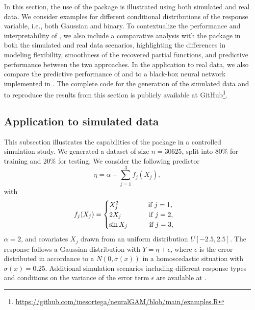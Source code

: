 In this section, the use of the  package is illustrated using both simulated and real data. We consider examples for different conditional distributions of the response variable, i.e., both Gaussian and binary. 
To contextualize the performance and interpretability of , we also include a comparative analysis with the  package in both the simulated and real data scenarios, highlighting the differences in modeling flexibility, smoothness of the recovered partial functions, and predictive performance between the two approaches. In the application to real data, we also compare the predictive performance of  and  to a black-box neural network implemented in . The complete code for the generation of the simulated data and to reproduce the results from this section is publicly available at GitHub\footnote{\url{https://github.com/inesortega/neuralGAM/blob/main/examples.R}}.

\subsection{Application to simulated data}

This subsection illustrates the capabilities of the  package in a controlled simulation study. We generated a dataset of size $n = 30625$, split into 80\% for training and 20\% for testing. We consider the following predictor
%
\begin{equation*}
   \eta = \alpha + \sum_{j=1}^3 f_j(X_j),
\end{equation*}
%
\noindent with
%
\begin{equation*}
    f_j(X_j) = 
    \begin{cases}
    X_j^2 \hspace{1.4cm} \text{ if } j=1, \\ 
    2X_j \hspace{1.3cm} \text{ if } j=2, \\ 
    \sin{X_j} \hspace{1cm} \text{ if } j=3,
    \end{cases}
\end{equation*}
%
\noindent $\alpha = 2$, and covariates $X_j$ drawn from an uniform distribution $U\left[-2.5, 2.5\right]$. The response follows a Gaussian distribution with $Y = \eta + \epsilon$, where $\epsilon$ is the error distributed in accordance to a $N(0, \sigma(x))$ in a homoscedastic situation with $\sigma(x) = 0.25$. Additional simulation scenarios including different response types and conditions on the variance of the error term $\epsilon$ are available at \citet{neuralGAM}. 

